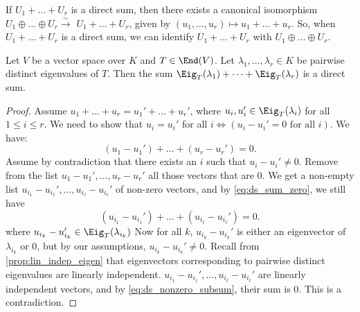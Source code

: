 \begin{exercise}\label{ex:canonical_iso_direct_sum}
  If $U_1 + \dots + U_r$ is a direct sum, then there exists a canonical isomorphism $U_1 \oplus \dots \oplus U_r \xrightarrow{\sim} $ $U_1 + \dots + U_r$, given by $(u_1, \dots, u_r) \mapsto u_1 + \dots + u_r$. So, when $U_1 + \dots + U_r$ is a direct sum, we can identify $U_1 + \dots + U_r$ with $U_1 \oplus \dots \oplus U_r$.
\end{exercise}

\begin{proposition}\label{prop:direct_sum_eigenspaces}
  Let $V$ be a vector space over $K$ and $T \in \End(V)$. Let $\lambda_1, \dots, \lambda_r \in K$ be pairwise distinct eigenvalues of $T$. Then the sum $\Eig_T(\lambda_1) + \dots + \Eig_T(\lambda_r)$ is a direct sum.
\end{proposition}

\begin{proof}
  Assume $u_1 + \dots + u_r = u_1' + \dots + u_r'$, where $u_i, u_i' \in \Eig_T(\lambda_i)$ for all $1 \le i \le r$. We need to show that $u_i = u_i'$ for all $i \iff (u_i - u_i' = 0 \text{ for all } i)$.
  We have:
  \begin{equation} \label{eq:ds_sum_zero}
    (u_1 - u_1') + \dots + (u_r - u_r') = 0.
  \end{equation}
  Assume by contradiction that there exists an $i$ such that $u_i - u_i' \ne 0$.
  Remove from the list $u_1 - u_1', \dots, u_r - u_r'$ all those vectors that are 0. We get a non-empty list $u_{i_1} - u_{i_1}', \dots, u_{i_\ell} - u_{i_\ell}'$ of non-zero vectors, and by \eqref{eq:ds_sum_zero}, we still have
  \begin{equation} \label{eq:ds_nonzero_subsum}
    (u_{i_1} - u_{i_1}') + \dots + (u_{i_\ell} - u_{i_\ell}') = 0.
  \end{equation}
  where $u_{i_k} - u_{i_k}' \in \Eig_T(\lambda_{i_k})$
  Now for all $k$, $u_{i_k} - u_{i_k}'$ is either an eigenvector of $\lambda_{i_k}$ or 0, but by our assumptions, $u_{i_k} - u_{i_k}' \ne 0$.
  Recall from \cref{prop:lin_indep_eigen} that eigenvectors corresponding to pairwise distinct eigenvalues are linearly independent. $u_{i_1} - u_{i_1}', \dots, u_{i_\ell} - u_{i_\ell}'$ are linearly independent vectors, and by \eqref{eq:ds_nonzero_subsum}, their sum is $0$. This is a contradiction.
\end{proof}

